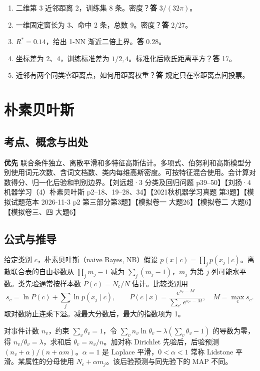 \documentclass[UTF8,a4paper,zihao=-4,fontset=fandol]{ctexart}
\begin{document}
\begin{enumerate}[nosep]
\item 二维第 3 近邻距离 2，训练集 8 条。密度？\textbf{答} \(3/(32\pi)\)。
\item 一维固定窗长为 3、命中 2 条，总数 9。密度？\textbf{答} \(2/27\)。
\item \(R^*=0.14\)，给出 1-NN 渐近二倍上界。\textbf{答} \(0.28\)。
\item 坐标差为 2、4，训练标准差为 \(1/2,4\)。标准化后欧氏距离平方？\textbf{答} 17。
\item 近邻有两个同类零距离点，如何用距离权重？\textbf{答} 规定只在零距离点间投票。
\end{enumerate}

\section{朴素贝叶斯}
\label{ch:prml-nb}

\subsection{考点、概念与出处}
\textbf{优先} 联合条件独立、离散平滑和多特征高斯估计。多项式、伯努利和高斯模型分别使用词元次数、含词文档数、类内每维高斯密度。可按特征混合使用。会计算对数得分、归一化后验和判别边界。【刘远超·3 分类及回归问题 p39–50】【刘扬·4机器学习（4）朴素贝叶斯 p2–18、19–28、34】【2021秋机器学习真题 第3题】【模拟试题范本 2026-11-3 p2 第三部分第3题】【模拟卷一 大题26】【模拟卷二 大题6】【模拟卷三、四 大题6】

\subsection{公式与推导}
给定类别 \(c\)，朴素贝叶斯（naive Bayes, NB）假设 \(p(x\mid c)=\prod_jp(x_j\mid c)\)。离散联合表的自由参数从 \(\prod_jm_j-1\) 减为 \(\sum_j(m_j-1)\)，\(m_j\) 为第 \(j\) 列可能水平数。类先验通常按样本数 \(P(c)=N_c/N\) 估计。比较类别用
\[
 s_c=\ln P(c)+\sum_j\ln p(x_j\mid c),\qquad
 P(c\mid x)=\frac{e^{s_c-M}}{\sum_{c'}e^{s_{c'}-M}},\quad M=\max_c s_c .
\]
取对数防止连乘下溢。减最大分数后，最大的指数项为 1。

对事件计数 \(n_v\)，约束 \(\sum_v\theta_v=1\)，令 \(\sum_vn_v\ln\theta_v-\lambda(\sum_v\theta_v-1)\) 的导数为零，得 \(n_v/\theta_v=\lambda\)，求和后 \(\theta_v=n_v/n\)。加对称 Dirichlet 先验后，后验预测 \((n_v+\alpha)/(n+\alpha m)\)。\(\alpha=1\) 是 Laplace 平滑，\(0<\alpha<1\) 常称 Lidstone 平滑。某属性的分母使用 \(N_c+\alpha m_j\)。该后验预测与同先验下的 MAP 不同。
\end{document}
